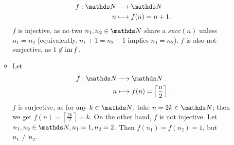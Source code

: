 \documentclass{homework}
\begin{document}
\begin{solution}
\begin{itemize}
\begin{itemize}
\begin{align*}
            f: \N &\longrightarrow \N \\
            n &\longmapsto f(n) = n + 1
          .\end{align*}
          $f$ is injective, as no two $n_1,n_2\in \N$ share a $succ(n)$ unless  $n_1=n_2$
          (equivalently, $n_1+1 = n_2 + 1$ implies  $n_1=n_2$). $f$ is also not surjective, as $1\not\in
          \operatorname{im} f$.
        \item Let \begin{align*}
          f: \N &\longrightarrow \N \\
          n &\longmapsto f(n) = \left\lceil \frac{n}{2} \right\rceil 
        .\end{align*}
        $f$ is surjective, as for any $k \in \N$, take $n = 2k \in \N$; then we get $f(n) =
        \left\lceil \frac{2k}{2}\right\rceil = k$. On the other hand,  $f$ is not injective. Let
        $n_1, n_2\in \N, n_1 = 1, n_2 =2$. Then $f(n_1)=f(n_2)=1$, but $n_1\neq n_2$.
      \end{itemize}
  \end{itemize}
\end{solution}
\end{document}
